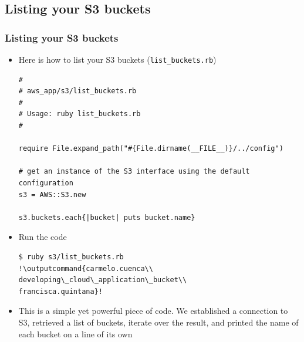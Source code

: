 \documentclass{beamer}
\newcommand{\outputcommand}[1]{\color{darkgreen}{#1}}
\begin{document}
\subsection{Listing your S3 buckets}
\begin{frame}
\frametitle{Listing your S3 buckets}
\begin{itemize}
\item Here is how to list your S3 buckets (\texttt{list\_buckets.rb})

\lstset{language=Ruby, style=eclipse}
\begin{lstlisting}[escapechar=!]
#
# aws_app/s3/list_buckets.rb
#
# Usage: ruby list_buckets.rb
#

require File.expand_path("#{File.dirname(__FILE__)}/../config")

# get an instance of the S3 interface using the default configuration
s3 = AWS::S3.new

s3.buckets.each{|bucket| puts bucket.name}
\end{lstlisting}

\item Run the code
\lstset{language=shell}
\begin{lstlisting}[escapechar=!]
$ ruby s3/list_buckets.rb
!\outputcommand{carmelo.cuenca\\
developing\_cloud\_application\_bucket\\
francisca.quintana}!
\end{lstlisting}

\item This is a simple yet powerful piece of code. We established a connection to S3, retrieved a list of buckets, iterate over the result, and printed the name of each bucket on a line of its own
\end{itemize}
\end{frame}
\end{document}
